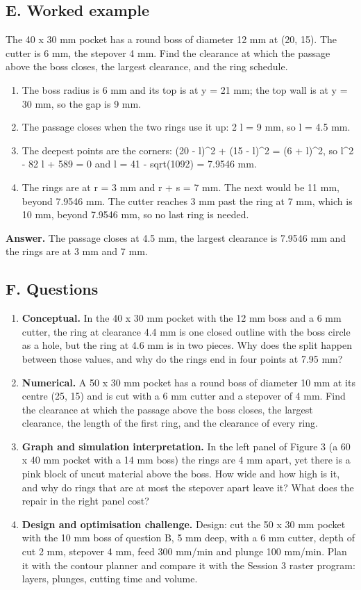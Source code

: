 \documentclass[11pt,a4paper]{article}
\begin{document}
\subsection*{E. Worked example}
The 40 x 30 mm pocket has a round boss of diameter 12 mm at (20, 15). The cutter is 6 mm, the stepover 4 mm. Find the clearance at which the passage above the boss closes, the largest clearance, and the ring schedule.
\begin{enumerate}[nosep]
\item The boss radius is 6 mm and its top is at y = 21 mm; the top wall is at y = 30 mm, so the gap is 9 mm.
\item The passage closes when the two rings use it up: 2 l = 9 mm, so l = 4.5 mm.
\item The deepest points are the corners: (20 - l)\textasciicircum{}2 + (15 - l)\textasciicircum{}2 = (6 + l)\textasciicircum{}2, so l\textasciicircum{}2 - 82 l + 589 = 0 and l = 41 - sqrt(1092) = 7.9546 mm.
\item The rings are at r = 3 mm and r + s = 7 mm. The next would be 11 mm, beyond 7.9546 mm. The cutter reaches 3 mm past the ring at 7 mm, which is 10 mm, beyond 7.9546 mm, so no last ring is needed.
\end{enumerate}
\textbf{Answer.} The passage closes at 4.5 mm, the largest clearance is 7.9546 mm and the rings are at 3 mm and 7 mm.

\subsection*{F. Questions}
\begin{enumerate}[nosep]
\item \textbf{Conceptual.} In the 40 x 30 mm pocket with the 12 mm boss and a 6 mm cutter, the ring at clearance 4.4 mm is one closed outline with the boss circle as a hole, but the ring at 4.6 mm is in two pieces. Why does the split happen between those values, and why do the rings end in four points at 7.95 mm?
\item \textbf{Numerical.} A 50 x 30 mm pocket has a round boss of diameter 10 mm at its centre (25, 15) and is cut with a 6 mm cutter and a stepover of 4 mm. Find the clearance at which the passage above the boss closes, the largest clearance, the length of the first ring, and the clearance of every ring.
\item \textbf{Graph and simulation interpretation.} In the left panel of Figure 3 (a 60 x 40 mm pocket with a 14 mm boss) the rings are 4 mm apart, yet there is a pink block of uncut material above the boss. How wide and how high is it, and why do rings that are at most the stepover apart leave it? What does the repair in the right panel cost?
\item \textbf{Design and optimisation challenge.} Design: cut the 50 x 30 mm pocket with the 10 mm boss of question B, 5 mm deep, with a 6 mm cutter, depth of cut 2 mm, stepover 4 mm, feed 300 mm/min and plunge 100 mm/min. Plan it with the contour planner and compare it with the Session 3 raster program: layers, plunges, cutting time and volume.
\end{enumerate}
\end{document}
